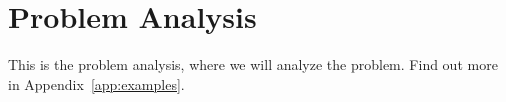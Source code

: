 \documentclass[../main.tex]{subfiles}
\begin{document}
\chapter{Problem Analysis}

This is the problem analysis, where we will analyze the problem. \cite{example}
Find out more in Appendix~\ref{app:examples}.


% 
\end{document}
